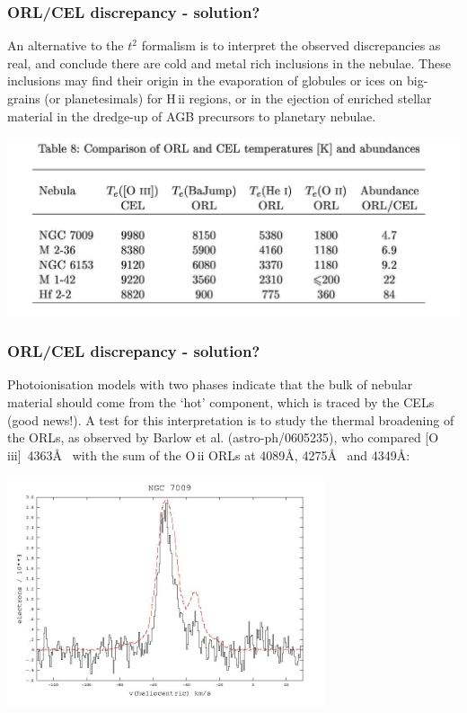 \begin{frame}\frametitle{ORL/CEL discrepancy - solution?}

An alternative to the $t^2$ formalism is to interpret the observed
discrepancies as real, and conclude there are cold and metal rich
inclusions in the nebulae. These inclusions may find their origin in
the evaporation of globules or ices on big-grains (or planetesimals)
for H\,{\sc ii} regions, or in the ejection of enriched stellar
material in the dredge-up of AGB precursors to planetary nebulae.


\begin{center}
      \includegraphics[width=\textwidth,height=!]{./C/orl_cel_table.jpg}
\end{center}

\end{frame}
\begin{frame}\frametitle{ORL/CEL discrepancy - solution?}


Photoionisation models with two phases indicate that the bulk of
nebular material should come from the `hot' component, which is traced
by the CELs (good news!). A test for this interpretation is to study
the thermal broadening of the ORLs, as observed by Barlow et
al. (astro-ph/0605235), who compared [O\,{\sc iii}]~4363\AA~ with the
sum of the O\,{\sc ii} ORLs at 4089\AA, 4275\AA~ and 4349\AA:
\begin{center}
      \includegraphics[width=0.7\textwidth,height=!]{./C/n7009_bHROS.jpg}
\end{center}


\end{frame}

